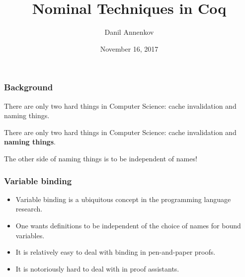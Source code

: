 \documentclass[10pt]{beamer}
\title{Nominal Techniques in Coq}
\author{Danil Annenkov}
\institute{University of Copenhagen}
\date{November 16, 2017}
\begin{document}
\maketitle


\begin{frame}
  \frametitle{Background}

   {\begin{exampleblock}{}
    \large{There are only two hard things in Computer Science: cache
    invalidation and naming things.}

    \vskip5mm
  \hspace*{}
  \end{exampleblock}}

   {\begin{exampleblock}{}
    \large{There are only two hard things in Computer Science: cache
      invalidation and \textbf{naming things}.}

    \vskip5mm
    \hspace*{}
  \end{exampleblock}

  The other side of naming things is to be independent of names!}

\end{frame}

\begin{frame}
  \frametitle{Variable binding}
  \begin{itemize}
  \item Variable binding is a ubiquitous concept in the programming language research.
  \item One wants definitions to be independent of the choice of names
    for bound variables.
  \item It is relatively easy to deal with binding in pen-and-paper proofs.
  \item It is notoriously hard to deal with in proof assistants.
  \end{itemize}
\end{frame}
\end{document}

